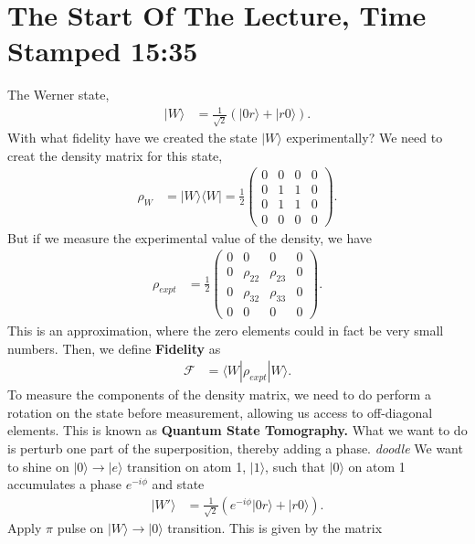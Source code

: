 \documentclass[lasers.tex]{subfiles}
\begin{document}
\section{The Start Of The Lecture, Time Stamped 15:35}
The Werner state,
\begin{align}
    |W\rangle &= \frac{1}{\sqrt{2}}\left(|0r\rangle + |r0\rangle\right).
\end{align}
With what fidelity have we created the state $|W\rangle$ experimentally?
We need to creat the density matrix for this state,
\begin{align}
    \rho_W &= |W\rangle\langle W| = \frac12 \begin{pmatrix} 0 & 0 & 0 & 0 \\ 0 & 1 & 1 & 0 \\ 0 & 1 & 1 & 0 \\ 0 & 0 & 0 & 0 \end{pmatrix}.
\end{align}
But if we measure the experimental value of the density, we have
\begin{align}
    \rho_{expt} &= \frac12 \begin{pmatrix} 0 & 0 & 0 & 0 \\ 0 & \rho_{22} & \rho_{23} & 0 \\ 0 & \rho_{32} & \rho_{33} & 0 \\ 0 & 0 & 0 & 0 \end{pmatrix}.
\end{align}
This is an approximation, where the zero elements could in fact be very small numbers. 
Then, we define \textbf{Fidelity} as
\begin{align}
    \mathcal{F} &= \langle W|\rho_{expt}|W\rangle.
\end{align}
To measure the components of the density matrix, we need to do perform a rotation on the state before measurement, allowing us access to off-diagonal elements.
This is known as \textbf{Quantum State Tomography.}
What we want to do is perturb one part of the superposition, thereby adding a phase.
\emph{doodle}
We want to shine on $|0\rangle\to|e\rangle$ transition on atom 1, $|1\rangle$, such that $|0\rangle$ on atom 1 accumulates a phase $e^{-i\phi}$ and state
\begin{align}
    |W'\rangle &= \frac{1}{\sqrt{2}}\left(e^{-i\phi}|0r\rangle + |r0\rangle\right).
\end{align}
Apply $\pi$ pulse on $|W\rangle\to|0\rangle$ transition. 
This is given by the matrix
\end{document}
